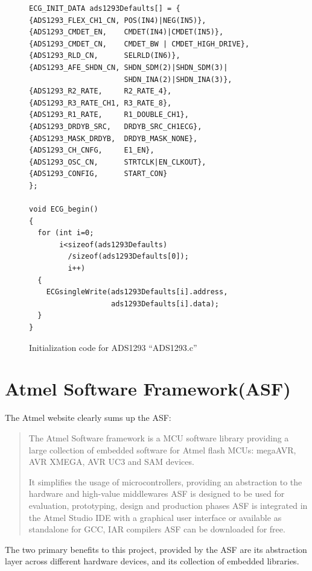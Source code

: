 \begin{figure}
	\begin{center}
		\label{fig:ADS1293_INIT}
\begin{lstlisting}[frame=single,morekeywords={ECG_INIT_DATA}]
ECG_INIT_DATA ads1293Defaults[] = {
{ADS1293_FLEX_CH1_CN, POS(IN4)|NEG(IN5)}, 
{ADS1293_CMDET_EN,    CMDET(IN4)|CMDET(IN5)},
{ADS1293_CMDET_CN,    CMDET_BW | CMDET_HIGH_DRIVE},
{ADS1293_RLD_CN,      SELRLD(IN6)},
{ADS1293_AFE_SHDN_CN, SHDN_SDM(2)|SHDN_SDM(3)|
                      SHDN_INA(2)|SHDN_INA(3)},
{ADS1293_R2_RATE,     R2_RATE_4},
{ADS1293_R3_RATE_CH1, R3_RATE_8},
{ADS1293_R1_RATE,     R1_DOUBLE_CH1},
{ADS1293_DRDYB_SRC,   DRDYB_SRC_CH1ECG},
{ADS1293_MASK_DRDYB,  DRDYB_MASK_NONE},
{ADS1293_CH_CNFG,     E1_EN},
{ADS1293_OSC_CN,      STRTCLK|EN_CLKOUT},
{ADS1293_CONFIG,      START_CON}
};

void ECG_begin()
{
  for (int i=0;
       i<sizeof(ads1293Defaults)
         /sizeof(ads1293Defaults[0]);
         i++)
  {
    ECGsingleWrite(ads1293Defaults[i].address,
                   ads1293Defaults[i].data);
  }
}
\end{lstlisting}
		\caption{Initialization code for ADS1293 ``ADS1293.c''}
	\end{center}
\end{figure}



\section{Atmel Software Framework(ASF)}
The Atmel website clearly sums up the ASF:

\begin{quotation}
The Atmel Software framework is a MCU software library providing a large collection of embedded software for Atmel flash MCUs: megaAVR, AVR XMEGA, AVR UC3 and SAM devices.

It  simplifies the usage of microcontrollers, providing an abstraction to the hardware and high-value middlewares
ASF is designed to be used for evaluation, prototyping, design and production phases
ASF is integrated in the Atmel Studio IDE with a graphical user interface or available as standalone for GCC, IAR compilers
ASF can be downloaded for free. \cite{AtmelStudio}
\end{quotation} 

The two primary benefits to this project, provided by the ASF are its abstraction layer across different hardware devices, and its collection of embedded libraries.

